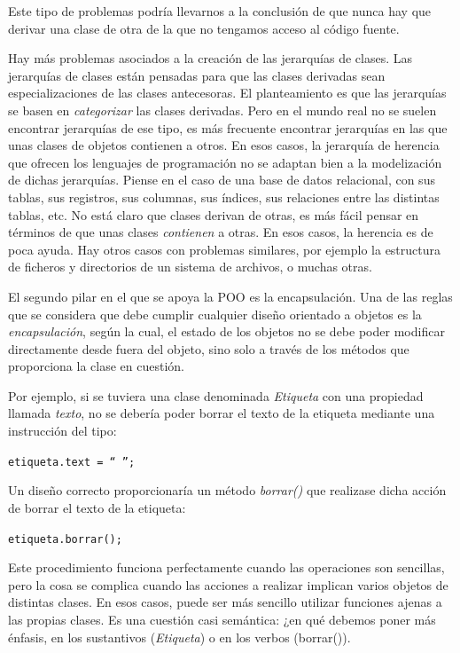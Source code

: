 Este tipo de problemas podría llevarnos a la conclusión de que nunca hay que derivar una clase de otra de la que no tengamos acceso al código fuente.

Hay más problemas asociados a la creación de las jerarquías de clases. Las jerarquías de clases están pensadas para que las clases derivadas sean especializaciones de las clases antecesoras. El planteamiento es que las jerarquías se basen en \textit{categorizar} las clases derivadas. Pero en el mundo real no se suelen encontrar jerarquías de ese tipo, es más frecuente encontrar jerarquías en las que unas clases de objetos contienen a otros. En esos casos, la jerarquía de herencia que ofrecen los lenguajes de programación no se adaptan bien a la modelización de dichas jerarquías. Piense en el caso de una base de datos relacional, con sus tablas, sus registros, sus columnas, sus índices, sus relaciones entre las distintas tablas, etc. No está claro que clases derivan de otras, es más fácil pensar en términos de que unas clases \textit{contienen} a otras. En esos casos, la herencia es de poca ayuda. Hay otros casos con problemas similares, por ejemplo la estructura de ficheros y directorios de un sistema de archivos, o muchas otras.
  
El segundo pilar en el que se apoya la POO es la encapsulación. 
Una de las reglas que se considera que debe cumplir cualquier diseño orientado a objetos es la \textit{encapsulación}, según la cual, el estado de los objetos no se debe poder modificar directamente desde fuera del objeto, sino solo a través de los métodos que proporciona la clase en cuestión. 

Por ejemplo, si se tuviera una clase denominada \textit{Etiqueta} con una propiedad llamada \textit{texto}, no se debería poder borrar el texto de la etiqueta mediante una instrucción del tipo:

{\centering \texttt{etiqueta.text = `` '';} \par}

Un diseño correcto proporcionaría un método \textit{borrar()} que realizase dicha acción de borrar el texto de la etiqueta:

{\centering \texttt{etiqueta.borrar();} \par}

Este procedimiento funciona perfectamente cuando las operaciones son sencillas, pero la cosa se complica cuando las acciones a realizar implican varios objetos de distintas clases. En esos casos, puede ser más sencillo utilizar funciones ajenas a las propias clases. Es una cuestión casi semántica: ¿en qué debemos poner más énfasis, en los sustantivos (\textit{Etiqueta}) o en los verbos (borrar()).

